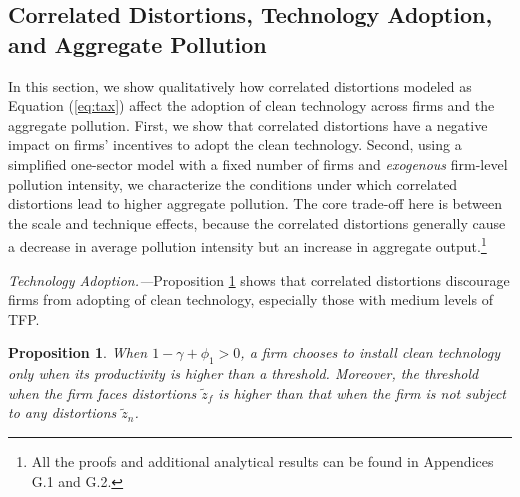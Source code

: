 \documentclass[AEJ]{AEA}
\newtheorem{proposition}{Proposition}
\begin{document}
\subsection{Correlated Distortions, Technology Adoption, and Aggregate Pollution}
\label{sec:analytical}

In this section, we show qualitatively how correlated distortions modeled as Equation (\ref{eq:tax}) affect the adoption of clean technology across firms and the aggregate pollution. First, we show that correlated distortions have a negative impact on firms' incentives to adopt the clean technology. Second, using a simplified one-sector model with a fixed number of firms and \emph{exogenous} firm-level pollution intensity, we characterize the conditions under which correlated distortions lead to higher aggregate pollution. The core trade-off here is between the scale and technique effects, because the correlated distortions generally cause a decrease in average pollution intensity but an increase in aggregate output.\footnote{All the proofs and additional analytical results can be found in Appendices G.1 and G.2.}

\textit{Technology Adoption.---}Proposition \ref{prop:friction} shows that correlated distortions discourage firms from adopting of clean technology, especially those with medium levels of TFP.
\begin{proposition}
\label{prop:friction}
When $1-\gamma+\phi_1>0$, a firm chooses to install clean technology only when its productivity is higher than a threshold. Moreover, the threshold when the firm faces distortions $\tilde{z}_f$ is higher than that when the firm is not subject to any distortions $\tilde{z}_n$.
\end{proposition}
\end{document}
